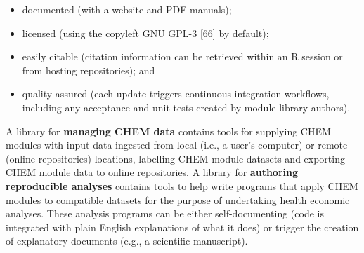 \documentclass[
]{article}
\begin{document}
\begin{itemize}
\item
  documented (with a website and PDF manuals);
\item
  licensed (using the copyleft GNU GPL-3 {[}66{]} by default);
\item
  easily citable (citation information can be retrieved within an R session or from hosting repositories); and
\item
  quality assured (each update triggers continuous integration workflows, including any acceptance and unit tests created by module library authors).
\end{itemize}

A library for \textbf{managing CHEM data} contains tools for supplying CHEM modules with input data ingested from local (i.e., a user's computer) or remote (online repositories) locations, labelling CHEM module datasets and exporting CHEM module data to online repositories. A library for \textbf{authoring reproducible analyses} contains tools to help write programs that apply CHEM modules to compatible datasets for the purpose of undertaking health economic analyses. These analysis programs can be either self-documenting (code is integrated with plain English explanations of what it does) or trigger the creation of explanatory documents (e.g., a scientific manuscript).
\end{document}
